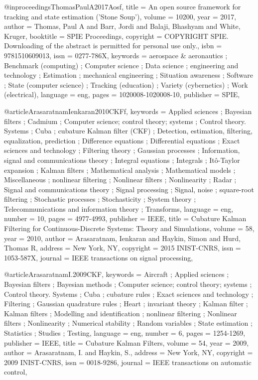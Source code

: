 @inproceedings{ThomasPaulA2017Aosf,
title = {An open source framework for tracking and state estimation ('Stone Soup')},
volume = {10200},
year = {2017},
author = {Thomas, Paul A and Barr, Jordi and Balaji, Bhashyam and White, Kruger},
booktitle = {SPIE Proceedings},
copyright = {COPYRIGHT SPIE. Downloading of the abstract is permitted for personal use only.},
isbn = {9781510609013},
issn = {0277-786X},
keywords = {aerospace & aeronautics ; Benchmark (computing) ; Computer science ; Data science ; engineering and technology ; Estimation ; mechanical engineering ; Situation awareness ; Software ; State (computer science) ; Tracking (education) ; Variety (cybernetics) ; Work (electrical)},
language = {eng},
pages = {1020008-1020008-10},
publisher = {SPIE},
}

@article{ArasaratnamIenkaran2010CKFf,
keywords = {Applied sciences ; Bayesian filters ; Cadmium ; Computer science; control theory; systems ; Control theory. Systems ; Cuba ; cubature Kalman filter (CKF) ; Detection, estimation, filtering, equalization, prediction ; Difference equations ; Differential equations ; Exact sciences and technology ; Filtering theory ; Gaussian processes ; Information, signal and communications theory ; Integral equations ; Integrals ; Itô-Taylor expansion ; Kalman filters ; Mathematical analysis ; Mathematical models ; Miscellaneous ; nonlinear filtering ; Nonlinear filters ; Nonlinearity ; Radar ; Signal and communications theory ; Signal processing ; Signal, noise ; square-root filtering ; Stochastic processes ; Stochasticity ; System theory ; Telecommunications and information theory ; Transforms},
language = {eng},
number = {10},
pages = {4977-4993},
publisher = {IEEE},
title = {Cubature Kalman Filtering for Continuous-Discrete Systems: Theory and Simulations},
volume = {58},
year = {2010},
author = {Arasaratnam, Ienkaran and Haykin, Simon and Hurd, Thomas R},
address = {New York, NY},
copyright = {2015 INIST-CNRS},
issn = {1053-587X},
journal = {IEEE transactions on signal processing},
}

@article{ArasaratnamI.2009CKF,
keywords = {Aircraft ; Applied sciences ; Bayesian filters ; Bayesian methods ; Computer science; control theory; systems ; Control theory. Systems ; Cuba ; cubature rules ; Exact sciences and technology ; Filtering ; Gaussian quadrature rules ; Heart ; invariant theory ; Kalman filter ; Kalman filters ; Modelling and identification ; nonlinear filtering ; Nonlinear filters ; Nonlinearity ; Numerical stability ; Random variables ; State estimation ; Statistics ; Studies ; Testing},
language = {eng},
number = {6},
pages = {1254-1269},
publisher = {IEEE},
title = {Cubature Kalman Filters},
volume = {54},
year = {2009},
author = {Arasaratnam, I. and Haykin, S.},
address = {New York, NY},
copyright = {2009 INIST-CNRS},
issn = {0018-9286},
journal = {IEEE transactions on automatic control},
}

